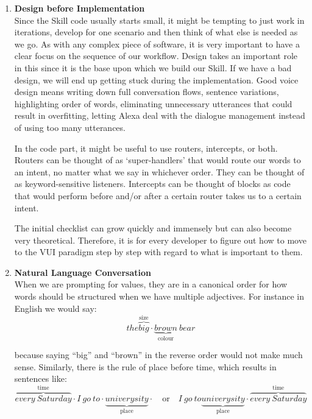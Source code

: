 \begin{enumerate}

\item \textbf{Design before Implementation}\\
Since the Skill code usually starts small, it might be tempting to just work in iterations, develop for one scenario and then think of what else is needed as we go.
As with any complex piece of software, it is very important to have a clear focus on the sequence of our workflow. Design takes an important role in this since it is the base upon which we build our Skill. If we have a bad design, we will end up getting stuck during the implementation. Good voice design means writing down full conversation flows, sentence variations, highlighting order of words, eliminating unnecessary utterances that could result in overfitting, letting Alexa deal with the dialogue management instead of using too many utterances.

In the code part, it might be useful to use routers, intercepts, or both.
Routers can be thought of as `super-handlers' that would route our words to an intent, no matter what we say in whichever order. They can be thought of as keyword-sensitive listeners. Intercepts can be thought of blocks as code that would perform before and/or after a certain router takes us to a certain intent.

The initial checklist can grow quickly and immensely but can also become very theoretical. Therefore, it is for every developer to figure out how to move to the VUI paradigm step by step with regard to what is important to them.



\item \textbf{Natural Language Conversation}\\
When we are prompting for values, they are in a canonical order for how words should be structured when we have multiple adjectives. For instance in English we would say:
\[
	the 
\overbrace{big}^\text{size} \cdot
\underbrace{brown}_\text{colour}
\ bear 
\]

\noindent because saying ``big'' and ``brown'' in the reverse order would not make much sense. Similarly, there is the rule of place before time, which results in sentences like: 
	\[
	\overbrace{every \ Saturday}^\text{time} \cdot
		I \ go \ to  \cdot
	\underbrace{univerysity}_\text{place} \cdot
	\quad \textrm{or} \quad
	I \ go \ to 
	\underbrace{univerysity}_\text{place} \cdot
	\overbrace{every \ Saturday}^\text{time}
	\]


\end{enumerate}
